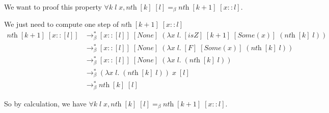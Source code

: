 \documentclass{article}
\theoremstyle{plain}
\newcommand{\rsbeta}{\to_\beta^*}
\newcommand{\nth}{\textit{nth}}
\newcommand{\none}{[\textit{None}]}
\begin{document}
\newpage

  We want to proof this property $\forall k\;l\;x, \textit{nth}\; [k]\; [l]
  =_\beta \textit{nth}\;[k+1]\;[x :: l]$.

  \proof We just need to compute one step of $\nth\;[k+1]\;[x::l]$
  \begin{align*}
    \nth\;[k+1]\;[x::[l]] &\rsbeta [x::[l]]\; \none\; 
    (\lambda x\;l.\;[\textit{isZ}]\; [k+1]\; [\textit{Some}(x)]\;
    (\nth\;[k]\;l)) \\
    &\rsbeta [x::[l]]\; \none\; 
    (\lambda x\;l.\;[F]\; [\textit{Some}(x)]\;
    (\nth\;[k]\;l)) \\
    &\rsbeta [x::[l]]\; \none\; 
    (\lambda x\;l.\;(\nth\;[k]\;l)) \\
    &\rsbeta (\lambda x\;l.\;(\nth\;[k]\;l))\;x\;[l]\\
    &\rsbeta \nth\;[k]\;[l]
  \end{align*}

  So by calculation, we have $\forall k\;l\;x, \textit{nth}\; [k]\; [l]
  =_\beta \textit{nth}\;[k+1]\;[x :: l]$.
\end{document}
